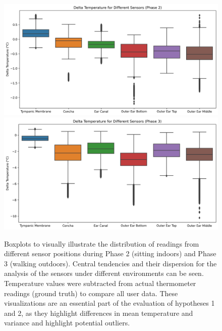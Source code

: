 \begin{figure}[!ht]
    \centering
    \includegraphics[width=\textwidth]{thesis-doc/images/study1/hypothesis1/hypothesis1_boxplot_phase_2.png}
    \includegraphics[width=\textwidth]{thesis-doc/images/study1/hypothesis1/hypothesis1_boxplot_phase_3.png}
    \caption{Boxplots to visually illustrate the distribution of readings from different sensor positions during Phase 2 (sitting indoors) and Phase 3 (walking outdoors). Central tendencies and their dispersion for the analysis of the sensors under different environments can be seen. Temperature values were subtracted from actual thermometer readings (ground truth) to compare all user data. These visualizations are an essential part of the evaluation of hypotheses 1 and 2, as they highlight differences in mean temperature and variance and highlight potential outliers.}
    \label{fig:eval:study1:hypothesis1_result}
\end{figure}

